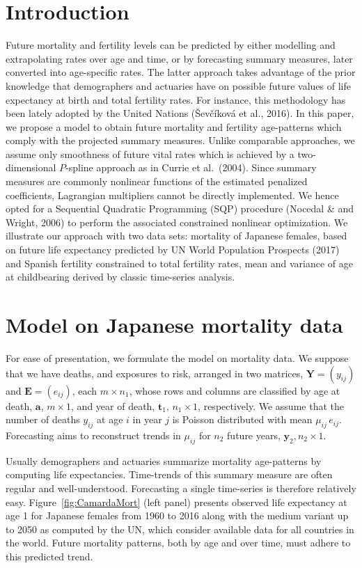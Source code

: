 \documentclass[twoside]{report}
\begin{document}
\section{Introduction}
Future mortality and fertility levels can be predicted by either modelling and extrapolating rates over age and time, or by forecasting summary measures, later converted into age-specific rates. 
The latter approach takes advantage of the prior knowledge that demographers and actuaries have on possible future values of life expectancy at birth and total fertility rates. For instance, this methodology has been lately adopted by the United Nations (\v{S}ev\v{c}\'ikov\'a et al., 2016). 
In this paper, we propose a model to obtain future mortality and fertility age-patterns which comply with the projected summary measures. Unlike comparable approaches, we assume only smoothness of future vital rates which is achieved by a two-dimensional $P$-spline approach as in Currie et al.~(2004). Since summary measures are commonly nonlinear functions of the estimated penalized coefficients, Lagrangian multipliers cannot be directly implemented. We hence opted for a Sequential Quadratic Programming (SQP) procedure (Nocedal \& and Wright, 2006) to perform the associated constrained nonlinear optimization.
We illustrate our approach with two data sets: mortality of Japanese females, based on future life expectancy predicted by UN World Population Prospects (2017) and Spanish fertility constrained to total fertility rates, mean and variance of age at childbearing derived by classic time-series analysis.

\section{Model on Japanese mortality data}

For ease of presentation, we formulate the model on mortality data. We suppose that we have deaths, and exposures to risk, arranged in two matrices, 
$\bm{Y} = (y_{ij})$ and $\bm{E} = (e_{ij})$, each $m \times n_{1}$, whose rows and columns are classified by age at death, $\bm{a}, \,m \times 1$, and year of death, $\bm{t}_{1}, \,n_{1} \times 1$, respectively.  
We assume that the number of deaths $y_{ij}$ at age $i$ in year $j$ is Poisson distributed with mean $\mu_{ij} \,e_{ij}$. %
Forecasting aims to reconstruct trends in $\mu_{ij}$ for $n_{2}$ future years, $\bm{y}_{2}, n_{2} \times 1$.

Usually demographers and actuaries summarize mortality age-patterns by computing life expectancies. Time-trends of this summary measure are often regular and well-understood. Forecasting a single time-series is therefore relatively easy. Figure~\ref{fig:CamardaMort} (left panel) presents observed life expectancy at age 1 for Japanese females from 1960 to 2016 along with the medium variant up to 2050 as computed by the UN, which consider available data for all countries in the world.  
Future mortality patterns, both by age and over time, must adhere to this predicted trend. 
\end{document}
